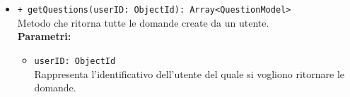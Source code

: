 \begin{itemize}
\begin{itemize}
	\item \texttt{+ getQuestions(userID: ObjectId): Array<QuestionModel>}\\
	Metodo che ritorna tutte le domande create da un utente.\\
	\textbf{Parametri:}
	\begin{itemize}
		\item \texttt{userID: ObjectId}\\
		Rappresenta l'identificativo dell'utente del quale si vogliono ritornare le domande.
	\end{itemize}
	\end{itemize}
\end{itemize}
